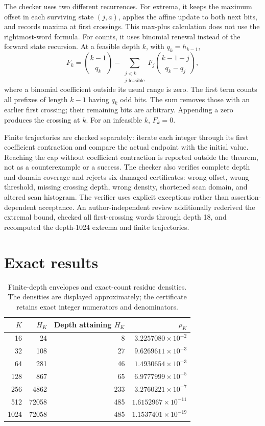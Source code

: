 \documentclass[11pt,a4paper]{amsart}
\theoremstyle{definition}
\theoremstyle{remark}
\begin{document}
The checker uses two different recurrences. For extrema, it keeps the
maximum offset in each surviving state $(j,a)$, applies the affine update
to both next bits, and records maxima at first crossings. This max-plus
calculation does not use the rightmost-word formula. For counts, it uses
binomial renewal instead of the forward state recursion. At a feasible
depth $k$, with $q_k=h_{k-1}$,
\begin{equation}\label{eq:renewal}
F_k=\binom{k-1}{q_k}
-\sum_{\substack{j<k\\j\text{ feasible}}}
F_j\binom{k-1-j}{q_k-q_j},
\end{equation}
where a binomial coefficient outside its usual range is zero. The first
term counts all prefixes of length $k-1$ having $q_k$ odd bits. The sum
removes those with an earlier first crossing; their remaining bits are
arbitrary. Appending a zero produces the crossing at $k$.
For an infeasible $k$, $F_k=0$.

Finite trajectories are checked separately: iterate each integer through
its first coefficient contraction and compare the actual endpoint with
the initial value. Reaching the cap without coefficient contraction is
reported outside the theorem, not as a counterexample or a success.
The checker also verifies complete depth and domain coverage and rejects
six damaged certificates: wrong offset, wrong threshold, missing crossing
depth, wrong density, shortened scan domain, and altered scan histogram.
The verifier uses explicit exceptions rather than assertion-dependent
acceptance. An author-independent review additionally rederived the
extremal bound, checked all first-crossing words through depth 18, and
recomputed the depth-1024 extrema and finite trajectories.

\section{Exact results}\label{sec:results}
\begin{table}[ht]
\centering
\caption{Finite-depth envelopes and exact-count residue densities.
The densities are displayed approximately; the certificate retains exact
integer numerators and denominators.}
\label{tab:main}
\begin{tabular}{rrrr}
\toprule
$K$&$H_K$&Depth attaining $H_K$&$\rho_K$\\
\midrule
16&24&8&$3.2257080\times10^{-2}$\\
32&108&27&$9.6269611\times10^{-3}$\\
64&281&46&$1.4930654\times10^{-3}$\\
128&867&65&$6.9777999\times10^{-5}$\\
256&4862&233&$3.2760221\times10^{-7}$\\
512&72058&485&$1.6152967\times10^{-11}$\\
1024&72058&485&$1.1537401\times10^{-19}$\\
\bottomrule
\end{tabular}
\end{table}
\end{document}
